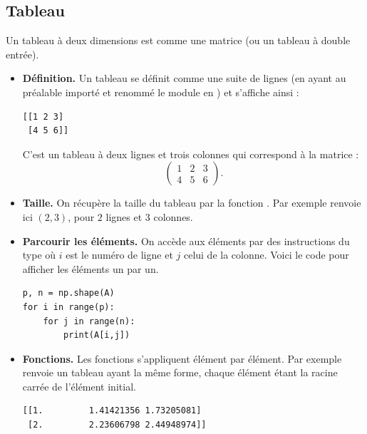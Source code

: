 \documentclass[11pt,class=report,crop=false]{standalone}
\begin{document}
\subsection{Tableau}

Un tableau à deux dimensions est comme une matrice (ou un tableau à double entrée).

\begin{itemize}
  \item \textbf{Définition.} Un tableau se définit comme une suite de lignes
(en ayant au préalable importé et renommé le module \numpy{} en ) et s'affiche ainsi :
  \begin{center}
  \begin{minipage}{0.15\textwidth}
\begin{lstlisting}
[[1 2 3]
 [4 5 6]]
\end{lstlisting}
  \end{minipage}
  \end{center}
  
 C'est un tableau à deux lignes et trois colonnes qui correspond à la matrice :
 $$\begin{pmatrix}1&2&3\\4&5&6\end{pmatrix}.$$

  \item \textbf{Taille.}  On récupère la taille du tableau par la fonction .  Par exemple  renvoie ici $(2,3)$, pour $2$ lignes et $3$ colonnes.
  
  \item \textbf{Parcourir les éléments.} On accède aux éléments par des instructions du type  où $i$ est le numéro de ligne et $j$ celui de la colonne. Voici le code pour afficher les éléments un par un.
  
  \begin{minipage}{0.59\textwidth}
  \end{minipage}
  \begin{minipage}{0.4\textwidth}
\begin{lstlisting}
p, n = np.shape(A)
for i in range(p):
	for j in range(n):
		print(A[i,j])
\end{lstlisting}
  \end{minipage}
  
  \item \textbf{Fonctions.} Les fonctions s'appliquent élément par élément. Par exemple  renvoie un tableau ayant la même forme, chaque élément étant la racine carrée de l'élément initial.
  \begin{center}
  \begin{minipage}{0.5\textwidth}
\begin{lstlisting}
[[1.         1.41421356 1.73205081]
 [2.         2.23606798 2.44948974]]
\end{lstlisting}
  \end{minipage}
  \end{center}  
  

\end{itemize}
\end{document}
